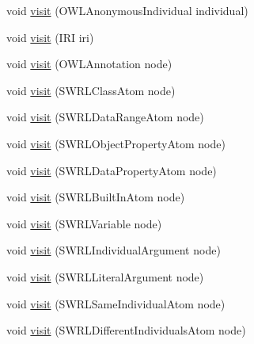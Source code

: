 \begin{DoxyCompactItemize}
\item 
void \hyperlink{classuk_1_1ac_1_1manchester_1_1cs_1_1owlapi_1_1dlsyntax_1_1_d_l_syntax_object_renderer_aafc1c1a70d4574df0e350ce2e9bc25bc}{visit} (O\-W\-L\-Anonymous\-Individual individual)
\item 
void \hyperlink{classuk_1_1ac_1_1manchester_1_1cs_1_1owlapi_1_1dlsyntax_1_1_d_l_syntax_object_renderer_a4fa0910eed19e1e646509444ffff4cc3}{visit} (I\-R\-I iri)
\item 
void \hyperlink{classuk_1_1ac_1_1manchester_1_1cs_1_1owlapi_1_1dlsyntax_1_1_d_l_syntax_object_renderer_a7fc887c5932266f673ac038f3dd6b714}{visit} (O\-W\-L\-Annotation node)
\item 
void \hyperlink{classuk_1_1ac_1_1manchester_1_1cs_1_1owlapi_1_1dlsyntax_1_1_d_l_syntax_object_renderer_a794209f8e15228a2ab47524c0925606a}{visit} (S\-W\-R\-L\-Class\-Atom node)
\item 
void \hyperlink{classuk_1_1ac_1_1manchester_1_1cs_1_1owlapi_1_1dlsyntax_1_1_d_l_syntax_object_renderer_aedf39d690cbbf808dfc35fc7efe13c63}{visit} (S\-W\-R\-L\-Data\-Range\-Atom node)
\item 
void \hyperlink{classuk_1_1ac_1_1manchester_1_1cs_1_1owlapi_1_1dlsyntax_1_1_d_l_syntax_object_renderer_a51a18dbeed43ba218231f37176ad8cef}{visit} (S\-W\-R\-L\-Object\-Property\-Atom node)
\item 
void \hyperlink{classuk_1_1ac_1_1manchester_1_1cs_1_1owlapi_1_1dlsyntax_1_1_d_l_syntax_object_renderer_ab6b3536e64ec7469676260942a24fb8d}{visit} (S\-W\-R\-L\-Data\-Property\-Atom node)
\item 
void \hyperlink{classuk_1_1ac_1_1manchester_1_1cs_1_1owlapi_1_1dlsyntax_1_1_d_l_syntax_object_renderer_a6469826ee4ca2c34b4700dc7f73a7a44}{visit} (S\-W\-R\-L\-Built\-In\-Atom node)
\item 
void \hyperlink{classuk_1_1ac_1_1manchester_1_1cs_1_1owlapi_1_1dlsyntax_1_1_d_l_syntax_object_renderer_a39231a26a56cf00d2450712d2d8e89f1}{visit} (S\-W\-R\-L\-Variable node)
\item 
void \hyperlink{classuk_1_1ac_1_1manchester_1_1cs_1_1owlapi_1_1dlsyntax_1_1_d_l_syntax_object_renderer_a2b2a5c92f40d33892248a25676fc1218}{visit} (S\-W\-R\-L\-Individual\-Argument node)
\item 
void \hyperlink{classuk_1_1ac_1_1manchester_1_1cs_1_1owlapi_1_1dlsyntax_1_1_d_l_syntax_object_renderer_a270bbc6189da16ee2aa38bd8b7b59b56}{visit} (S\-W\-R\-L\-Literal\-Argument node)
\item 
void \hyperlink{classuk_1_1ac_1_1manchester_1_1cs_1_1owlapi_1_1dlsyntax_1_1_d_l_syntax_object_renderer_abe15e0984a40e8dcd6e4342072b50db5}{visit} (S\-W\-R\-L\-Same\-Individual\-Atom node)
\item 
void \hyperlink{classuk_1_1ac_1_1manchester_1_1cs_1_1owlapi_1_1dlsyntax_1_1_d_l_syntax_object_renderer_a03ed707783a7a1ecd183b1aeb8bb824e}{visit} (S\-W\-R\-L\-Different\-Individuals\-Atom node)
\end{DoxyCompactItemize}
